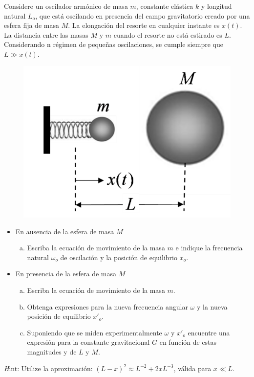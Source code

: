 \begin{ejercicio}
	Considere un oscilador armónico de masa $m$, constante elástica $k$ y longitud natural $L_o$, que está oscilando en presencia del campo gravitatorio creado por una esfera fija de masa $M$. La elongación del resorte en cualquier instante es $x(t)$. La distancia entre las masas $M$ y $m$ cuando el resorte no está estirado es $L$. Considerando n régimen de pequeñas oscilaciones, se cumple siempre que $L \gg x(t)$.
	\begin{figure}[H]
		\centering
		\includegraphics[scale=0.3]{./img/megabolas.png}
		\label{megabolas}
	\end{figure}
	\begin{itemize}
		\item En ausencia de la esfera de masa $M$
		\begin{enumerate}[a)]
			\item Escriba la ecuación de movimiento de la masa $m$ e indique la frecuencia natural $\omega _o$ de oscilación y la posición de equilibrio $x_o$.
		\end{enumerate}
		\item En presencia de la esfera de masa $M$
		\begin{enumerate}[a)]
			\item Escriba la ecuación de movimiento de la masa $m$.
			\item Obtenga expresiones para la nueva frecuencia angular $\omega$ y la nueva posición de equilibrio $x' _o$.
			\item Suponiendo que se miden experimentalmente $\omega$ y $x'_o$ encuentre una expresión para la constante gravitacional $G$ en función de estas magnitudes y de $L$ y $M$.
		\end{enumerate}
	\end{itemize}
	{\textit Hint: Utilize la aproximación: $(L - x)^2 \approx L^{-2} + 2xL^{-3}$, válida para $x\ll L$.}
\end{ejercicio}


































